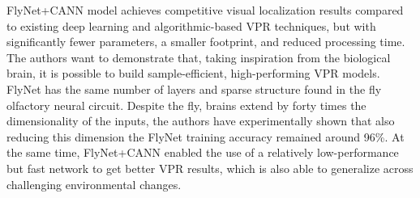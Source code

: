FlyNet+CANN model achieves competitive visual localization results
compared to existing deep learning and algorithmic-based VPR techniques,
but with significantly fewer parameters, a smaller footprint, and
reduced processing time. The authors want to demonstrate that, taking
inspiration from the biological brain, it is possible to build
sample-efficient, high-performing VPR models. FlyNet has the same number
of layers and sparse structure found in the fly olfactory neural
circuit. Despite the fly, brains extend by forty times the
dimensionality of the inputs, the authors have experimentally shown that
also reducing this dimension the FlyNet training accuracy remained
around 96\%. At the same time, FlyNet+CANN enabled the use of a
relatively low-performance but fast network to get better VPR results,
which is also able to generalize across challenging environmental
changes.